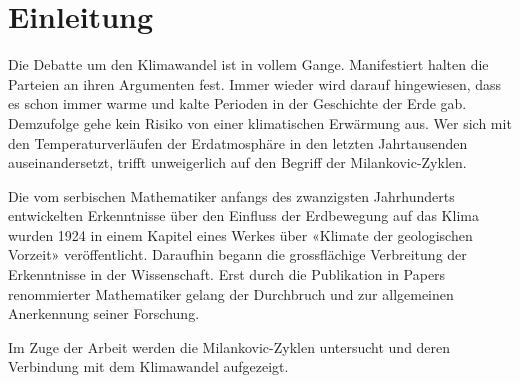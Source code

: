 %
%
%
%
\section{Einleitung\label{milankovic:section:Einleitung}}

Die Debatte um den Klimawandel ist in vollem Gange.
Manifestiert halten die Parteien an ihren Argumenten fest.
Immer wieder wird darauf hingewiesen, dass es schon immer warme und kalte Perioden in der Geschichte der Erde gab.
Demzufolge gehe kein Risiko von einer klimatischen Erwärmung aus.
Wer sich mit den Temperaturverläufen der Erdatmosphäre in den letzten Jahrtausenden auseinandersetzt, trifft unweigerlich auf den Begriff der Milankovic-Zyklen.

Die vom serbischen Mathematiker anfangs des zwanzigsten Jahrhunderts entwickelten Erkenntnisse über den Einfluss der Erdbewegung auf das Klima wurden 1924 in einem Kapitel eines Werkes über «Klimate der geologischen Vorzeit» veröffentlicht.
Daraufhin begann die grossflächige Verbreitung der Erkenntnisse in der Wissenschaft.
Erst durch die Publikation in Papers renommierter Mathematiker gelang der Durchbruch und zur allgemeinen Anerkennung seiner Forschung.

Im Zuge der Arbeit werden die Milankovic-Zyklen untersucht und deren Verbindung mit dem Klimawandel aufgezeigt. 

